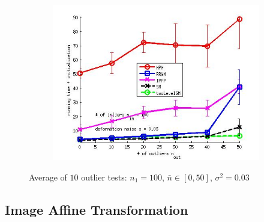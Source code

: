 \documentclass[
	fontsize=12pt,
	paper=a4,
	twoside=false,
	numbers=noenddot,
	plainheadsepline,
	toc=listof,
	toc=bibliography
]{scrartcl}
\begin{document}
\begin{figure}[h]
\begin{subfigure}[b]{0.3\textwidth}
		\includegraphics[scale=0.25]{"fig_ver2608/syntheticPointSets/ver4.3.2/outliertest_n50/time_summary_avg10t"} 
	\end{subfigure} 	
	\caption{Average of $10$ outlier tests: $n_1=100$, $\bar{n}\in[0,50]$, $\sigma^2=0.03$}
	\label{fig:test3_ver432}
\end{figure}

\FloatBarrier

\subsection{Image Affine Transformation}
\end{document}
